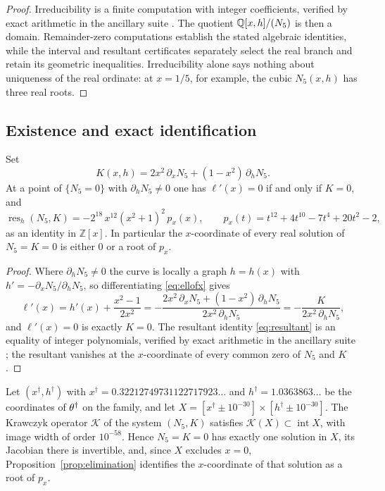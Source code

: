 \begin{proof}
Irreducibility is a finite computation with integer coefficients, verified by exact arithmetic in the ancillary suite \cite{anc}. The quotient $\mathbb{Q}[x,h]/(N_5)$ is then a domain. Remainder-zero computations establish the stated algebraic identities, while the interval and resultant certificates separately select the real branch and retain its geometric inequalities. Irreducibility alone says nothing about uniqueness of the real ordinate: at $x=1/5$, for example, the cubic $N_5(x,h)$ has three real roots.
\end{proof}

\subsection{Existence and exact identification}

\begin{proposition}[Elimination]\label{prop:elimination}
Set
\begin{equation}\label{eq:critpoly}
  K(x,h)=2x^2\,\partial_xN_5+(1-x^2)\,\partial_hN_5 .
\end{equation}
At a point of $\{N_5=0\}$ with $\partial_hN_5\neq0$ one has $\ell'(x)=0$ if and only if $K=0$, and
\begin{equation}\label{eq:resultant}
  \operatorname{res}_h(N_5,K)=-2^{18}\,x^{12}(x^2+1)^2\,p_x(x),
  \qquad p_x(t)=t^{12}+4t^{10}-7t^4+20t^2-2 ,
\end{equation}
as an identity in $\mathbb Z[x]$. In particular the $x$-coordinate of every real solution of $N_5=K=0$ is either $0$ or a root of $p_x$.
\end{proposition}

\begin{proof}
Where $\partial_hN_5\neq0$ the curve is locally a graph $h=h(x)$ with $h'=-\partial_xN_5/\partial_hN_5$, so differentiating \eqref{eq:ellofx} gives
\[
  \ell'(x)=h'(x)+\frac{x^2-1}{2x^2}
  =-\frac{2x^2\,\partial_xN_5+(1-x^2)\,\partial_hN_5}{2x^2\,\partial_hN_5}
  =-\frac{K}{2x^2\,\partial_hN_5} ,
\]
and $\ell'(x)=0$ is exactly $K=0$. The resultant identity \eqref{eq:resultant} is an equality of integer polynomials, verified by exact arithmetic in the ancillary suite \cite{anc}; the resultant vanishes at the $x$-coordinate of every common zero of $N_5$ and $K$.
\end{proof}

\begin{theorem}\label{thm:existence}
Let $(x^\dagger,h^\dagger)$ with $x^\dagger=0.32212749731122717923\ldots$ and $h^\dagger=1.0363863\ldots$ be the coordinates of $\theta^\dagger$ on the family, and let $X=[x^\dagger\pm10^{-30}]\times[h^\dagger\pm10^{-30}]$. The Krawczyk operator $\mathcal K$ of the system $(N_5,K)$ satisfies $\mathcal K(X)\subset\operatorname{int}X$, with image width of order $10^{-58}$. Hence $N_5=K=0$ has exactly one solution in $X$, its Jacobian there is invertible, and, since $X$ excludes $x=0$, Proposition~\textup{\ref{prop:elimination}} identifies the $x$-coordinate of that solution as a root of $p_x$.
\end{theorem}

